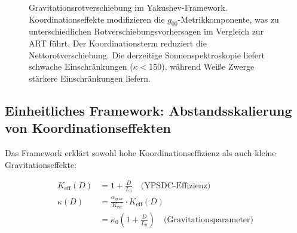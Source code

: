 \documentclass[11pt,a4paper]{article}
\begin{document}
\begin{figure}[htbp]
{
		}
		\caption{Gravitationsrotverschiebung im Yakushev-Framework. Koordinationseffekte modifizieren die $g_{00}$-Metrikkomponente, was zu unterschiedlichen Rotverschiebungsvorhersagen im Vergleich zur ART führt. Der Koordinationsterm reduziert die Nettorotverschiebung. Die derzeitige Sonnenspektroskopie liefert schwache Einschränkungen ($\kappa < 150$), während Weiße Zwerge stärkere Einschränkungen liefern.}
		\label{fig:redshift-detailed}
	\end{figure}
	\subsection{Einheitliches Framework: Abstandsskalierung von Koordinationseffekten}
	
	Das Framework erklärt sowohl hohe Koordinationseffizienz als auch kleine Gravitationseffekte:
	
	\begin{align}
		K_{\mathrm{eff}}(D) &= 1 + \frac{D}{L_0} \quad \text{(YPSDC-Effizienz)} \\
		\kappa(D) &= \frac{\alpha_{\text{grav}}}{K_{\text{ref}}} \cdot K_{\mathrm{eff}}(D) \\
		&= \kappa_0 \left(1 + \frac{D}{L_0}\right) \quad \text{(Gravitationsparameter)}
	\end{align}
	
\end{document}
